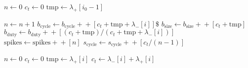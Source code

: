\begin{algorithm}
\begin{algorithmic}[1]
                \State $n \gets 0$ 
                \State $c_t \gets 0$ 
                \State $\text{tmp} \gets \lambda_+\left[i_0 - 1\right]$
                
                    \State $n \gets n+1$
                        \State $b_\text{cycle} \gets b_\text{cycle} +\!\!\!+  \left[c_t + \text{tmp} + \lambda_-\left[i\right]\right]\$$
                        \State $b_\text{size} \gets b_\text{size} +\!\!\!+  \left[c_t + \text{tmp}\right]$ 
                        \State $b_\text{duty} \gets b_\text{duty} +\!\!\!+  \left[\left(c_t + \text{tmp}\right)/\left(c_t + \text{tmp} + \lambda_-\left[i\right]\right)\right]$
                        \State $\text{spikes} \gets \text{spikes} +\!\!\!+ \left[n\right]$
                        \State $s_\text{cycle} \gets s_\text{cycle} +\!\!\!+ \left[c_t/\left(n-1\right)\right]$
                        
                        \State $n \gets 0$ 
                        \State $c_t \gets 0$ 
                        \State $\text{tmp} \gets \lambda_+\left[i\right]$
                    \Else
                        \State $c_t \gets \lambda_-\left[i\right] + \lambda_+\left[i\right]$
                    \EndIf
    \end{algorithmic}
    \label{alg:neuron}
\end{algorithm}

